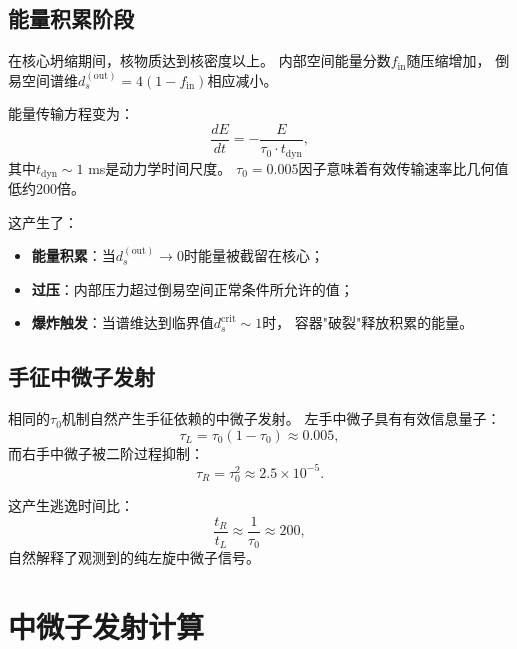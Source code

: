 \documentclass[twocolumn, tightenlines, showpacs, showkeys, nofootinbib]{revtex4-1}
\newcommand{\dout}{d_s^{(\text{out})}}
\newcommand{\tauzero}{\tau_0}
\begin{document}
\subsection{能量积累阶段}

在核心坍缩期间，核物质达到核密度以上。
内部空间能量分数$f_{\text{in}}$随压缩增加，
倒易空间谱维$\dout = 4(1-f_{\text{in}})$相应减小。

能量传输方程变为：
\begin{equation}
    \frac{dE}{dt} = -\frac{E}{\tauzero \cdot t_{\text{dyn}}},
\end{equation}
其中$t_{\text{dyn}} \sim 1$ ms是动力学时间尺度。
$\tauzero = 0.005$因子意味着有效传输速率比几何值低约200倍。

这产生了：
\begin{itemize}
    \item \textbf{能量积累}：当$\dout \to 0$时能量被截留在核心；
    \item \textbf{过压}：内部压力超过倒易空间正常条件所允许的值；
    \item \textbf{爆炸触发}：当谱维达到临界值$d_s^{\text{crit}} \sim 1$时，
          容器"破裂"释放积累的能量。
\end{itemize}

\subsection{手征中微子发射}

相同的$\tauzero$机制自然产生手征依赖的中微子发射。
左手中微子具有有效信息量子：
\begin{equation}
    \tau_L = \tauzero(1 - \tauzero) \approx 0.005,
\end{equation}
而右手中微子被二阶过程抑制：
\begin{equation}
    \tau_R = \tauzero^2 \approx 2.5 \times 10^{-5}.
\end{equation}

这产生逃逸时间比：
\begin{equation}
    \frac{t_R}{t_L} \approx \frac{1}{\tauzero} \approx 200,
\end{equation}
自然解释了观测到的纯左旋中微子信号。

\section{中微子发射计算}
\label{sec:neutrinos}
\end{document}
